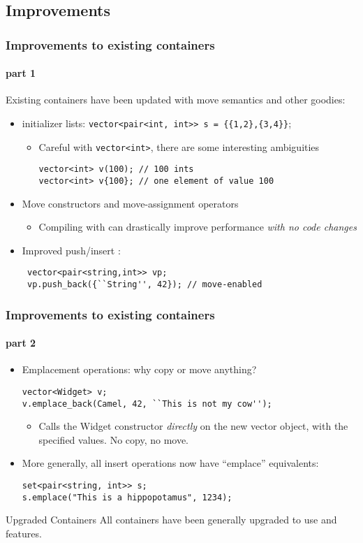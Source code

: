 \subsection{Improvements}
\begin{frame}[fragile]
\frametitle{Improvements to existing containers}
\framesubtitle{part 1}
Existing containers have been updated with move semantics and other goodies:
\begin{itemize}
\item initializer lists: \texttt{vector<pair<int, int>> s =
  \{\{1,2\},\{3,4\}\}};
  \begin{itemize}
  \item Careful with \texttt{vector<int>}, there are some interesting ambiguities
    \begin{verbatim}
vector<int> v(100); // 100 ints
vector<int> v{100}; // one element of value 100
    \end{verbatim}
   \end{itemize}
\item Move constructors and move-assignment operators
  \begin{itemize}
    \item Compiling with  can drastically improve performance
      \emph{with no code changes}
  \end{itemize}
\item Improved push/insert :
  \begin{verbatim}
 vector<pair<string,int>> vp;
 vp.push_back({``String'', 42}); // move-enabled
\end{verbatim}
\end{itemize}
\end{frame}

\begin{frame}[fragile]
\frametitle{Improvements to existing containers}
\framesubtitle{part 2}
\begin{itemize}
\item Emplacement operations: why copy or move anything?
\begin{verbatim}
vector<Widget> v;
v.emplace_back(Camel, 42, ``This is not my cow'');
\end{verbatim}
  \begin{itemize}
    \item Calls the Widget constructor \emph{directly} on the new
      vector object, with the specified values.  No copy, no move.
  \end{itemize}
\item More generally, all insert operations now have ``emplace''
  equivalents:
\begin{verbatim}
set<pair<string, int>> s;
s.emplace("This is a hippopotamus", 1234);
\end{verbatim}
\end{itemize}

\begin{block}{Upgraded Containers}
All containers have been generally upgraded to use  and 
features.
\end{block}

\end{frame}
